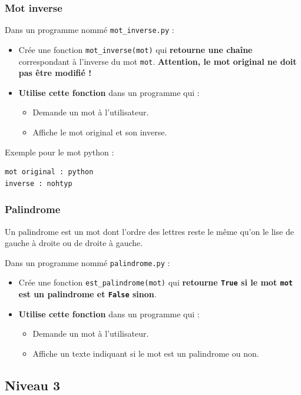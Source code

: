 \documentclass[11pt]{article}
\begin{document}
\subsubsection*{Mot inverse}
\label{sec:org537748c}
Dans un programme nommé \texttt{mot\_inverse.py} :
\begin{itemize}
\item Crée une fonction \texttt{mot\_inverse(mot)} qui \textbf{retourne une chaîne} correspondant à l'inverse du mot \texttt{mot}. \textbf{Attention, le mot original ne doit pas être modifié !}
\item \textbf{Utilise cette fonction} dans un programme qui :
\begin{itemize}
\item Demande un mot à l'utilisateur.
\item Affiche le mot original et son inverse.
\end{itemize}
\end{itemize}
Exemple pour le mot \og python\fg{} :
\begin{verbatim}
mot original : python
inverse : nohtyp
\end{verbatim}

\subsubsection*{Palindrome}
\label{sec:orgdf9f359}
Un palindrome est un mot dont l'ordre des lettres reste le même qu'on le lise de gauche à droite ou de droite à gauche.

Dans un programme nommé \texttt{palindrome.py} :
\begin{itemize}
\item Crée une fonction \texttt{est\_palindrome(mot)} qui \textbf{retourne \texttt{True} si le mot \texttt{mot} est un palindrome et \texttt{False} sinon}.
\item \textbf{Utilise cette fonction} dans un programme qui :
\begin{itemize}
\item Demande un mot à l'utilisateur.
\item Affiche un texte indiquant si le mot est un palindrome ou non.
\end{itemize}
\end{itemize}

\subsection*{Niveau 3}
\label{chapitre8_niv3}
\end{document}
